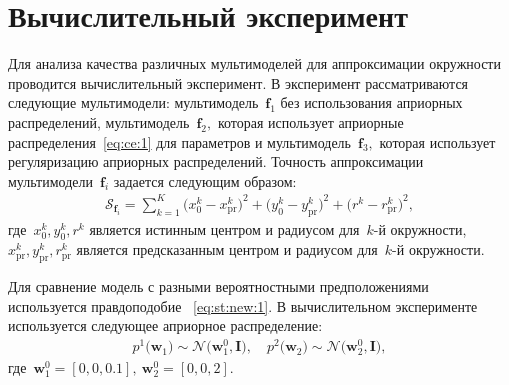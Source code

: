 \documentclass[12pt, twoside]{article}
\numberwithin{equation}{section}
\begin{document}
\section{Вычислительный эксперимент}
Для анализа качества различных мультимоделей для аппроксимации окружности проводится вычислительный эксперимент.
В эксперимент рассматриваются следующие мультимодели: мультимодель~$\textbf{f}_1$ без использования априорных распределений, мультимодель~$\textbf{f}_2,$ которая использует априорные распределения~\eqref{eq:ce:1} для параметров и мультимодель~$\textbf{f}_3,$ которая использует регуляризацию априорных распределений.
Точность аппроксимации мультимодели~$\textbf{f}_i$ задается следующим образом:
\[
\label{eq:ce:ex:0:1}
\begin{aligned}
\mathcal{S}_{\textbf{f}_i} = \sum_{k=1}^{K}\bigr(x^{k}_{0}-x^{k}_{\text{pr}}\bigr)^2+\bigr(y^{k}_{0}-y^{k}_{\text{pr}}\bigr)^2+\bigr(r^{k}-r^{k}_{\text{pr}}\bigr)^2,
\end{aligned}
\]
где~$x^{k}_0, y^{k}_0, r^{k}$ является истинным центром и радиусом для~$k$-й окружности,~$x^{k}_{\text{pr}}, y^{k}_{\text{pr}}, r^{k}_{\text{pr}}$ является предсказанным центром и радиусом для~$k$-й окружности.

Для сравнение модель с разными вероятностными предположениями используется правдоподобие ~\eqref{eq:st:new:1}.
В вычислительном эксперименте используется следующее априорное распределение:
\[
\label{eq:ce:1}
\begin{aligned}
p^{1}\bigr(\textbf{w}_1\bigr)\sim\mathcal{N}\bigr(\textbf{w}^{0}_{1}, \textbf{I}\bigr), \quad p^{2}\bigr(\textbf{w}_2\bigr)\sim\mathcal{N}\bigr(\textbf{w}^{0}_{2}, \textbf{I}\bigr),
\end{aligned}
\]
где~$\textbf{w}^{0}_1 = [0, 0, 0.1],\ \textbf{w}^{0}_2 = [0, 0, 2]$.
\end{document}
